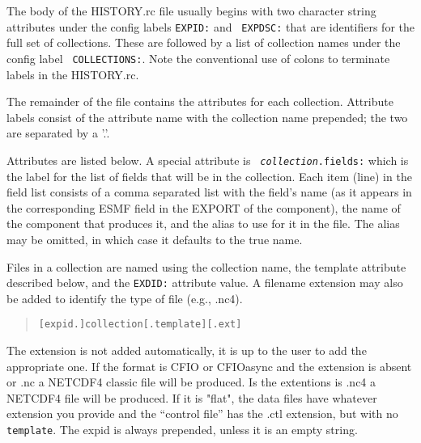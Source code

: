 The body of the HISTORY.rc file usually begins with two character
string attributes under the config labels {\tt EXPID:} and {\tt
  EXPDSC:} that are identifiers for the full set of collections. These
are followed by a list of collection names under the config label {\tt
  COLLECTIONS:}. Note the conventional use of colons to terminate
labels in the HISTORY.rc.

The remainder of the file contains the attributes for each collection.
Attribute labels consist of the attribute name with the collection
name prepended; the two are separated by a '.'.

Attributes are listed below. A special attribute is {\tt {\em
collection}.fields:} which is the label for the list of fields
that will be in the collection.  Each item (line) in the field list
consists of a comma separated list with the field's name (as it
appears in the corresponding ESMF field in the EXPORT of the
component), the name of the component that produces it, and the alias
to use for it in the file. The alias may be omitted, in which case it
defaults to the true name.

Files in a collection are named using the collection name, the
template attribute described below, and the {\tt EXDID:} attribute
value. A filename extension may also be added to identify the type of
file (e.g., .nc4).
\begin{quote}
    {\tt [expid.]collection[.template][.ext]}
\end{quote}
The extension is not added automatically, it is up to the user to add the appropriate one.
If the format is CFIO or CFIOasync and the extension is absent or .nc a NETCDF4 classic file
will be produced. Is the extentions is .nc4 a NETCDF4 file will be produced.
If it is "flat", the data files have whatever extension you provide and
the ``control file'' has the .ctl extension, but with no {\tt
template}. The expid is always prepended, unless it is an empty
string.


